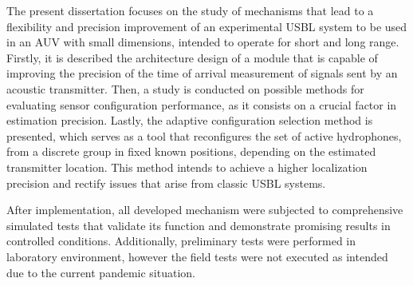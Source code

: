 The present dissertation focuses on the study of mechanisms that lead to a flexibility and precision improvement of an experimental USBL system to be used in an AUV with small dimensions, intended to operate for short and long range. Firstly, it is described the architecture design of a module that is capable of improving the precision of the time of arrival measurement of signals sent by an acoustic transmitter. Then, a study is conducted on possible methods for evaluating sensor configuration performance, as it consists on a crucial factor in estimation precision. Lastly, the adaptive configuration selection method is presented, which serves as a tool that reconfigures the set of active hydrophones, from a discrete group in fixed known positions, depending on the estimated transmitter location. This method intends to achieve a higher localization precision and rectify issues that arise from classic USBL systems.

After implementation, all developed mechanism were subjected to comprehensive simulated tests that validate its function and demonstrate promising results in controlled conditions. Additionally, preliminary tests were performed in laboratory environment, however the field tests were not executed as intended due to the current pandemic situation.